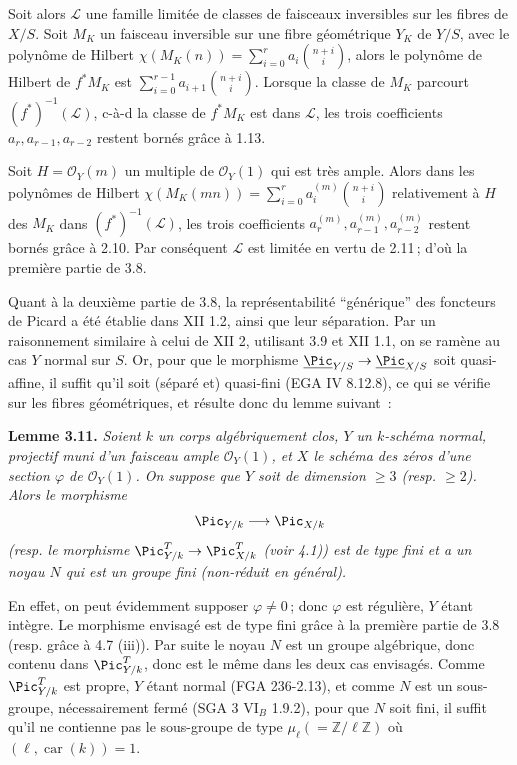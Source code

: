 Soit alors \(\mathcal L\) une famille limit\'ee de classes de faisceaux inversibles sur les fibres de \(X/S\). Soit \(M_K\) un faisceau inversible sur une fibre g\'eom\'etrique \(Y_K\) de \(Y/S\), avec le polyn\^ome de Hilbert \(\chi(M_K(n))=\sum_{i=0}^{r}a_i\binom{n+i}{i}\), alors le polyn\^ome de Hilbert de \(f^*M_K\) est \(\sum_{i=0}^{r-1}a_{i+1}\binom{n+i}{i}\). Lorsque la classe de \(M_K\) parcourt \((f^*)^{-1}(\mathcal L)\), c-\`a-d la
classe de \(f^*M_K\) est dans \(\mathcal L\), les trois coefficients \(a_r,a_{r-1},a_{r-2}\) restent born\'es gr\^ace \`a 1.13.

Soit \(H=\mathcal O_Y(m)\) un multiple de \(\mathcal O_Y(1)\) qui est tr\`es ample. Alors dans les polyn\^omes de Hilbert \(\chi(M_K(mn))=\sum_{i=0}^{r}a_i^{(m)}\binom{n+i}{i}\) relativement \`a \(H\) des \(M_K\) dans \((f^*)^{-1}(\mathcal L)\), les trois coefficients \(a_r^{(m)},a_{r-1}^{(m)},a_{r-2}^{(m)}\) restent born\'es gr\^ace \`a 2.10. Par cons\'equent \(\mathcal L\) est limit\'ee en vertu de 2.11\,; d'o\`u la premi\`ere partie de 3.8.

Quant \`a la deuxi\`eme partie de 3.8, la repr\'esentabilit\'e ``g\'en\'erique'' des foncteurs de Picard a \'et\'e \'etablie dans XII 1.2, ainsi que leur s\'eparation. Par un raisonnement similaire \`a celui de XII 2, utilisant 3.9 et XII 1.1, on se ram\`ene au cas \(Y\) normal sur \(S\). Or, pour que le morphisme \(\underline{\Pic}_{Y/S}\to\underline{\Pic}_{X/S}\) soit quasi-affine, il suffit qu'il soit (s\'epar\'e et) quasi-fini (EGA IV 8.12.8), ce qui se v\'erifie sur les fibres g\'eom\'etriques, et r\'esulte donc du lemme suivant~:

\textbf{Lemme 3.11.} \emph{Soient \(k\) un corps alg\'ebriquement clos, \(Y\) un \(k\)-sch\'ema normal, projectif muni d'un faisceau ample \(\mathcal O_Y(1)\), et \(X\) le sch\'ema des z\'eros d'une section \(\varphi\) de \(\mathcal O_Y(1)\). On suppose que \(Y\) soit de dimension \(\ge3\) (resp. \(\ge2\)). Alors le morphisme}
\[
\Pic_{Y/k}\longrightarrow\Pic_{X/k}
\]
\emph{(resp. le morphisme \(\Pic^T_{Y/k}\to\Pic^T_{X/k}\) (voir 4.1)) est de type fini et a un noyau \(N\) qui est un groupe fini (non-r\'eduit en g\'en\'eral).}

En effet, on peut \'evidemment supposer \(\varphi\ne0\)\,; donc \(\varphi\) est r\'eguli\`ere, \(Y\) \'etant int\`egre. Le morphisme envisag\'e est de type fini gr\^ace \`a la premi\`ere partie de 3.8 (resp. gr\^ace \`a 4.7 (iii)). Par suite le noyau \(N\) est un groupe alg\'ebrique, donc contenu dans \(\Pic^T_{Y/k}\), donc est le m\^eme
dans les deux cas envisag\'es. Comme \(\Pic^T_{Y/k}\) est propre, \(Y\) \'etant normal (FGA 236-2.13), et comme \(N\) est un sous-groupe, n\'ecessairement ferm\'e (SGA 3 VI\(_B\) 1.9.2), pour que \(N\) soit fini, il suffit qu'il ne contienne pas le sous-groupe de type \(\mu_\ell(=\mathbb Z/\ell\mathbb Z)\) o\`u \((\ell,\operatorname{car}(k))=1\).

